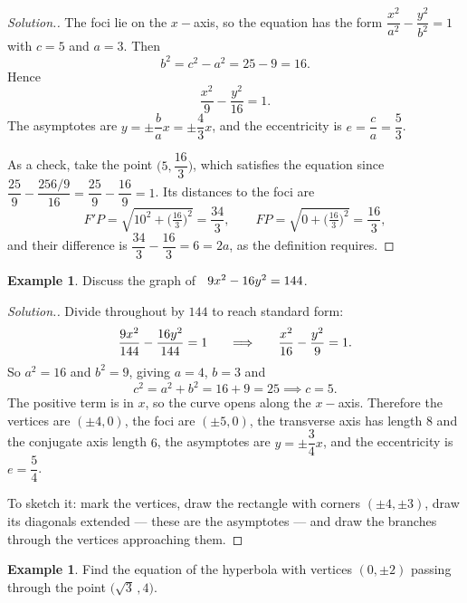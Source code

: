 \documentclass[11pt,a4paper]{article}
\theoremstyle{definition}
\newtheorem{exa}[thm]{Example}
\newenvironment{solution}
  {\renewcommand{\qedsymbol}{}\begin{proof}[\textit{Solution}.]}
  {\end{proof}}
\begin{document}
\begin{solution}
The foci lie on the $x-$axis, so the equation has the form
$\dfrac{x^2}{a^2} - \dfrac{y^2}{b^2} = 1$ with $c = 5$ and $a = 3$. Then
$$b^2 = c^2 - a^2 = 25 - 9 = 16 .$$
Hence
$$\dfrac{x^2}{9} - \dfrac{y^2}{16} = 1 .$$
The asymptotes are $y = \pm\dfrac{b}{a}x = \pm\dfrac{4}{3}x$, and the
eccentricity is $e = \dfrac{c}{a} = \dfrac{5}{3}$.

As a check, take the point $\Big(5, \dfrac{16}{3}\Big)$, which satisfies the
equation since $\dfrac{25}{9} - \dfrac{256/9}{16} = \dfrac{25}{9} -
\dfrac{16}{9} = 1$. Its distances to the foci are
$$F'P = \sqrt{10^2 + \Big(\tfrac{16}{3}\Big)^2} = \dfrac{34}{3},
\qquad FP = \sqrt{0 + \Big(\tfrac{16}{3}\Big)^2} = \dfrac{16}{3},$$
and their difference is $\dfrac{34}{3} - \dfrac{16}{3} = 6 = 2a$, as the
definition requires.
\end{solution}

\begin{exa}
Discuss the graph of $\hspace{0.2cm} 9x^2 - 16y^2 = 144$.
\end{exa}

\begin{solution}
Divide throughout by $144$ to reach standard form:
$$\dfrac{9x^2}{144} - \dfrac{16y^2}{144} = 1
\hspace{0.5cm}\implies\hspace{0.5cm}
\dfrac{x^2}{16} - \dfrac{y^2}{9} = 1 .$$
So $a^2 = 16$ and $b^2 = 9$, giving $a = 4$, $b = 3$ and
$$c^2 = a^2 + b^2 = 16 + 9 = 25 \implies c = 5 .$$
The positive term is in $x$, so the curve opens along the $x-$axis. Therefore
the vertices are $(\pm 4, 0)$, the foci are $(\pm 5, 0)$, the transverse axis
has length $8$ and the conjugate axis length $6$, the asymptotes are
$y = \pm\dfrac{3}{4}x$, and the eccentricity is $e = \dfrac{5}{4}$.

To sketch it: mark the vertices, draw the rectangle with corners
$(\pm 4, \pm 3)$, draw its diagonals extended --- these are the asymptotes ---
and draw the branches through the vertices approaching them.
\end{solution}

\begin{exa}
Find the equation of the hyperbola with vertices $(0,\pm 2)$ passing through the
point $\big(\sqrt{3}\,, 4\big)$.
\end{exa}
\end{document}
